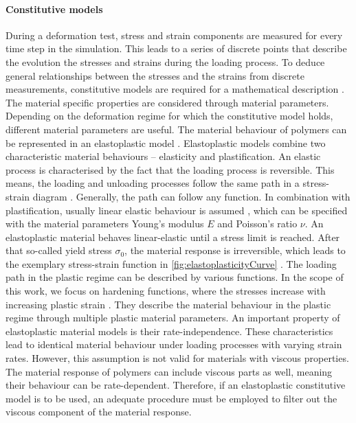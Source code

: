 \paragraph{Constitutive models}
During a deformation test, stress and strain components are measured for every time step in the simulation. This leads to a series of discrete points that describe the evolution the stresses and strains during the loading process. To deduce general relationships between the stresses and the strains from discrete measurements, constitutive models are required for a mathematical description \cite{mergheim_lecture_nodate}. The material specific properties are considered through material parameters.
Depending on the deformation regime for which the constitutive model holds, different material parameters are useful. The material behaviour of polymers can be represented in an elastoplastic model \cite{ward_mechanical_2013}. Elastoplastic models combine two characteristic material behaviours – elasticity and plastification. An elastic process is characterised by the fact that the loading process is reversible. This means, the loading and unloading processes follow the same path in a stress-strain diagram \cite{mergheim_lecture_nodate}. Generally, the path can follow any function. In combination with plastification, usually linear elastic behaviour is assumed \cite{saabye_ottosen_mechanics_2005}, which can be specified with the material parameters Young's modulus $E$ and Poisson's ratio $\nu$. An elastoplastic material behaves linear-elastic until a stress limit is reached. After that so-called yield stress $\sigma_0$, the material response is irreversible, which leads to the exemplary stress-strain function in \autoref{fig:elastoplasticityCurve} \cite{mergheim_lecture_nodate}. The loading path in the plastic regime can be described by various functions. In the scope of this work, we focus on hardening functions, where the stresses increase with increasing plastic strain \cite{saabye_ottosen_mechanics_2005}. They describe the material behaviour in the plastic regime through multiple plastic material parameters. An important property of elastoplastic material models is their rate-independence. These characteristics lead to identical material behaviour under loading processes with varying strain rates. However, this assumption is not valid for materials with viscous properties. The material response of polymers can include viscous parts as well, meaning their behaviour can be rate-dependent. Therefore, if an elastoplastic constitutive model is to be used, an adequate procedure must be employed to filter out the viscous component of the material response. 


